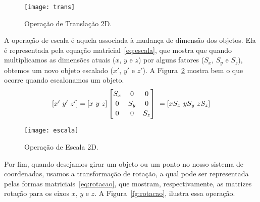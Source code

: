 \begin{figure}[ht!]
	\centering
	\texttt{[image: trans]}
	\caption{Operação de Translação 2D.}
	\label{fg:trans}
\end{figure} 

A operação de escala é aquela associada à mudança de dimensão dos objetos. Ela é representada pela equação matricial~\ref{eq:escala}, que mostra que quando multiplicamos as dimensões atuais ($x$, $y$ e $z$) por alguns fatores ($S_x$, $S_y$ e $S_z$), obtemos um novo objeto escalado ($x'$, $y'$ e $z'$). A Figura~\ref{fg:escala} mostra bem o que ocorre quando escalonamos um objeto.\\

\begin{equation}\label{eq:escala}
    \begin{array}{c c c}
    [x' \ y' \ z'] = [x \ y \ z]
    \begin{bmatrix}
     S_x & 0 & 0   \\[0.2em]
     0 & S_y & 0   \\[0.2em]
     0 & 0 & S_z
    \end{bmatrix}
    \
    = [xS_x\ yS_y\ zS_z]
    \end{array}
\end{equation}

\begin{figure}[ht!]
      \centering
	  \texttt{[image: escala]}
	  \caption{Operação de Escala 2D.}
	  \label{fg:escala}
\end{figure} 

Por fim, quando desejamos girar um objeto ou um ponto no nosso sistema de coordenadas, usamos a transformação de rotação, a qual pode ser representada pelas formas matriciais~\ref{eq:rotacao}, que mostram, respectivamente, as matrizes rotação para os eixos $x$, $y$ e $z$. A Figura~\ref{fg:rotacao}, ilustra essa operação.

